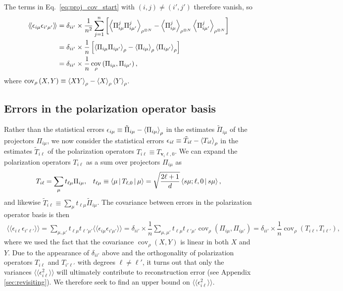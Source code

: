\documentclass[nofootinbib,twocolumn]{revtex4-1}
\newcommand{\f}[2]{\dfrac{#1}{#2}} %
\newcommand{\p}[1]{\left(#1\right)} %
\renewcommand{\sp}[1]{\left[#1\right]} %
\newcommand{\bk}{\Braket} %
\newcommand{\bbk}[1]{\langle\!\langle #1 \rangle\!\rangle}
\DeclareMathOperator{\cov}{cov}
\begin{document}
The terms in Eq.~\eqref{eq:proj_cov_start} with $\p{i,j}\ne\p{i',j'}$ therefore vanish, so
\begin{align}
  \bbk{\epsilon_{i\mu} \epsilon_{i'\mu'}}
  &= \delta_{ii'} \times \f1{n^2} \sum_{j=1}^n \sp{\bk{\Pi_{i\mu}^j \Pi_{i\mu'}^j}_{\rho^{\otimes N}}
    - \bk{\Pi_{i\mu}^j}_{\rho^{\otimes N}}
    \bk{\Pi_{i\mu'}^j}_{\rho^{\otimes N}}} \\
  &= \delta_{ii'} \times \f1n \sp{\bk{\Pi_{i\mu} \Pi_{i\mu'}}_\rho
    - \bk{\Pi_{i\mu}}_\rho \bk{\Pi_{i\mu'}}_\rho} \\
  &= \delta_{ii'} \times \f1n \cov_\rho\p{\Pi_{i\mu}, \Pi_{i\mu'}},
\end{align}
where $\cov_\rho\p{X,Y} \equiv \bk{XY}_\rho - \bk{X}_\rho \bk{Y}_\rho$.

\subsection{Errors in the polarization operator basis}

Rather than the statistical errors $\epsilon_{i\mu} \equiv \tilde\Pi_{i\mu} - \bk{\Pi_{i\mu}}_\rho$ in the estimates $\tilde\Pi_{i\mu}$ of the projectors $\Pi_{i\mu}$, we now consider the statistical errors $\epsilon_{i\ell} \equiv \tilde T_{i\ell} - \bk{T_{i\ell}}_\rho$ in the estimates $\tilde T_{i\ell}$ of the polarization operators $T_{i\ell} \equiv T_{\bm v_i\ell,0}$.
We can expand the polarization operators $T_{i\ell}$ as a sum over projectors $\Pi_{i\mu}$ as
\begin{align}
  T_{i\ell} = \sum_\mu t_{\ell\mu} \Pi_{i\mu},
  &&
  t_{\ell\mu} \equiv \bk{\mu|T_{\ell,0}|\mu}
  = \sqrt{\f{2\ell+1}{d}} \bk{s\mu;\ell,0|s\mu},
\end{align}
and likewise $\tilde T_{i\ell} \equiv \sum_\mu t_{\ell\mu} \tilde\Pi_{i\mu}$.
The covariance between errors in the polarization operator basis is then
\begin{align}
  \bbk{\epsilon_{i\ell} \epsilon_{i'\ell'}}
  = \sum_{\mu,\mu'} t_{\ell\mu} t_{\ell'\mu'}
  \bbk{\epsilon_{i\mu} \epsilon_{i'\mu'}}
  = \delta_{ii'} \times \f1n
  \sum_{\mu,\mu'} t_{\ell\mu} t_{\ell'\mu'}
  \cov_\rho\p{\Pi_{i\mu}, \Pi_{i\mu'}}
  = \delta_{ii'} \times \f1n \cov_\rho\p{T_{i\ell}, T_{i\ell'}},
\end{align}
where we used the fact that the covariance $\cov_\rho\p{X,Y}$ is linear in both $X$ and $Y$.
Due to the appearance of $\delta_{ii'}$ above and the orthogonality of polarization operators $T_{i\ell}$ and $T_{i'\ell'}$ with degrees $\ell\ne\ell'$, it turns out that only the variances $\bbk{\epsilon_{i\ell}^2}$ will ultimately contribute to reconstruction error (see Appendix \ref{sec:revisiting}).
We therefore seek to find an upper bound on $\bbk{\epsilon_{i\ell}^2}$.
\end{document}
